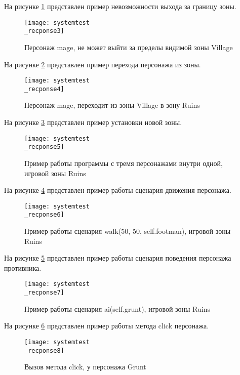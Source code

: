 На рисунке \ref{systemtest_recponse3:image} представлен пример невозможности выхода за границу зоны.
\begin{figure}[H]
	\centering
	\texttt{[image: systemtest\\\_recponse3]}
	\caption{Персонаж mage, не может выйти за пределы видимой зоны Village}
	\label{systemtest_recponse3:image}
\end{figure}

На рисунке \ref{systemtest_recponse4:image} представлен пример перехода персонажа из зоны.
\begin{figure}[H]
	\centering
	\texttt{[image: systemtest\\\_recponse4]}
	\caption{Персонаж mage, переходит из зоны Village в зону Ruins}
	\label{systemtest_recponse4:image}
\end{figure}

На рисунке \ref{systemtest_recponse5:image} представлен пример установки новой зоны.
\begin{figure}[H]
	\centering
	\texttt{[image: systemtest\\\_recponse5]}
	\caption{Пример работы программы с тремя персонажами внутри одной, игровой зоны Ruins}
	\label{systemtest_recponse5:image}
\end{figure}

На рисунке \ref{systemtest_recponse6:image} представлен пример работы сценария движения персонажа.
\begin{figure}[H]
	\centering
	\texttt{[image: systemtest\\\_recponse6]}
	\caption{Пример работы сценария walk(50, 50, self.footman), игровой зоны Ruins}
	\label{systemtest_recponse6:image}
\end{figure}

На рисунке \ref{systemtest_recponse7:image} представлен пример работы сценария поведения персонажа противника.
\begin{figure}[H]
	\centering
	\texttt{[image: systemtest\\\_recponse7]}
	\caption{Пример работы сценария ai(self.grunt), игровой зоны Ruins}
	\label{systemtest_recponse7:image}
\end{figure}

На рисунке \ref{systemtest_recponse8:image} представлен пример работы метода click персонажа.
\begin{figure}[H]
	\centering
	\texttt{[image: systemtest\\\_recponse8]}
	\caption{Вызов метода click, у персонажа Grunt}
	\label{systemtest_recponse8:image}
\end{figure}